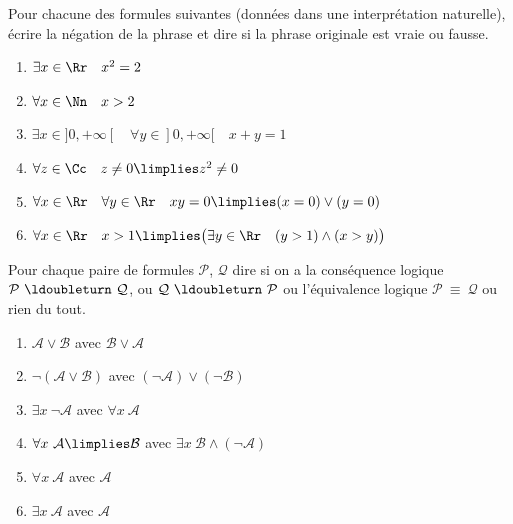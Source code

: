 \documentclass[11pt,class=report,crop=false]{standalone}
\begin{document}
\begin{exercicecours}
Pour chacune des formules suivantes (données dans une interprétation naturelle), écrire la négation de la phrase et dire si la phrase originale est vraie ou fausse.
\begin{enumerate}
	\item $\exists x \in \Rr \quad x^2=2$
	
	\item $\forall x \in \Nn \quad x > 2$
	
	\item $\exists x \in {}]0,+\infty[{} \quad \forall y \in {}]0,+\infty[{} \quad x+y=1$
	
	\item $\forall z \in \Cc \quad z \neq 0 \limplies z^2 \neq 0$
	
	\item $\forall x \in \Rr \quad \forall y \in \Rr \quad xy = 0 \limplies (x=0) \lor (y=0)$
	
	\item $\forall x \in \Rr \quad x > 1 \limplies \big( \exists y \in \Rr \quad (y>1) \land (x>y)\big)$
\end{enumerate}

\end{exercicecours}


\begin{exercicecours}
Pour chaque paire de formules $\mathcal{P}$, $\mathcal{Q}$ dire si on a la conséquence logique $\mathcal{P} \ \ldoubleturn \ \mathcal{Q}$, ou $\mathcal{Q} \ \ldoubleturn \ \mathcal{P}$ ou l'équivalence logique $\mathcal{P} \ \equiv \ \mathcal{Q}$ ou rien du tout.
\begin{enumerate}
	\item $\mathcal{A} \lor \mathcal{B}$ avec $\mathcal{B} \lor \mathcal{A}$
	
	\item $\lnot(\mathcal{A} \lor \mathcal{B})$ avec $(\lnot \mathcal{A}) \lor (\lnot\mathcal{B})$
	
	\item $\exists x \ \lnot\mathcal{A}$ avec $\forall x \ \mathcal{A}$
	
	\item $\forall x \ \mathcal{A} \limplies \mathcal{B}$ avec $\exists x \ \mathcal{B} \land (\lnot \mathcal{A})$
	
	\item $\forall x \ \mathcal{A}$ avec $\mathcal{A}$
	
	\item $\exists x \ \mathcal{A}$ avec $\mathcal{A}$
\end{enumerate}
\end{exercicecours}
\end{document}
